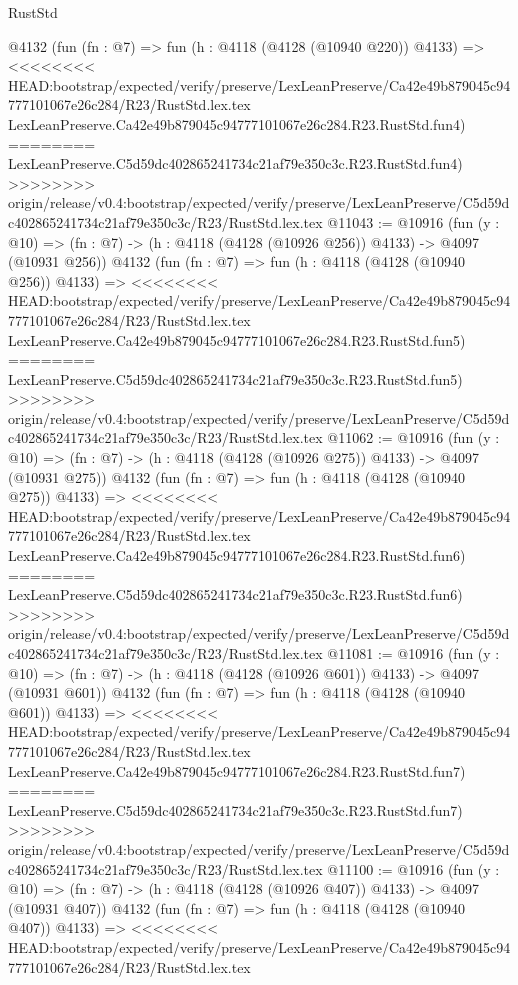 \begin{lexlean}{RustStd}
\begin{coremodule}
{\begin{coremodule}
{{{{{{{{{{{{{{    @4132
    (fun (fn : @7) =>
    fun (h : @4118 (@4128 (@10940 @220)) @4133) =>
<<<<<<<< HEAD:bootstrap/expected/verify/preserve/LexLeanPreserve/Ca42e49b879045c94777101067e26c284/R23/RustStd.lex.tex
    LexLeanPreserve.Ca42e49b879045c94777101067e26c284.R23.RustStd.fun4)
========
    LexLeanPreserve.C5d59dc402865241734c21af79e350c3c.R23.RustStd.fun4)
>>>>>>>> origin/release/v0.4:bootstrap/expected/verify/preserve/LexLeanPreserve/C5d59dc402865241734c21af79e350c3c/R23/RustStd.lex.tex
@11043 := @10916
    (fun (y : @10) => (fn : @7) -> (h : @4118 (@4128 (@10926 @256)) @4133) -> @4097 (@10931 @256))
    @4132
    (fun (fn : @7) =>
    fun (h : @4118 (@4128 (@10940 @256)) @4133) =>
<<<<<<<< HEAD:bootstrap/expected/verify/preserve/LexLeanPreserve/Ca42e49b879045c94777101067e26c284/R23/RustStd.lex.tex
    LexLeanPreserve.Ca42e49b879045c94777101067e26c284.R23.RustStd.fun5)
========
    LexLeanPreserve.C5d59dc402865241734c21af79e350c3c.R23.RustStd.fun5)
>>>>>>>> origin/release/v0.4:bootstrap/expected/verify/preserve/LexLeanPreserve/C5d59dc402865241734c21af79e350c3c/R23/RustStd.lex.tex
@11062 := @10916
    (fun (y : @10) => (fn : @7) -> (h : @4118 (@4128 (@10926 @275)) @4133) -> @4097 (@10931 @275))
    @4132
    (fun (fn : @7) =>
    fun (h : @4118 (@4128 (@10940 @275)) @4133) =>
<<<<<<<< HEAD:bootstrap/expected/verify/preserve/LexLeanPreserve/Ca42e49b879045c94777101067e26c284/R23/RustStd.lex.tex
    LexLeanPreserve.Ca42e49b879045c94777101067e26c284.R23.RustStd.fun6)
========
    LexLeanPreserve.C5d59dc402865241734c21af79e350c3c.R23.RustStd.fun6)
>>>>>>>> origin/release/v0.4:bootstrap/expected/verify/preserve/LexLeanPreserve/C5d59dc402865241734c21af79e350c3c/R23/RustStd.lex.tex
@11081 := @10916
    (fun (y : @10) => (fn : @7) -> (h : @4118 (@4128 (@10926 @601)) @4133) -> @4097 (@10931 @601))
    @4132
    (fun (fn : @7) =>
    fun (h : @4118 (@4128 (@10940 @601)) @4133) =>
<<<<<<<< HEAD:bootstrap/expected/verify/preserve/LexLeanPreserve/Ca42e49b879045c94777101067e26c284/R23/RustStd.lex.tex
    LexLeanPreserve.Ca42e49b879045c94777101067e26c284.R23.RustStd.fun7)
========
    LexLeanPreserve.C5d59dc402865241734c21af79e350c3c.R23.RustStd.fun7)
>>>>>>>> origin/release/v0.4:bootstrap/expected/verify/preserve/LexLeanPreserve/C5d59dc402865241734c21af79e350c3c/R23/RustStd.lex.tex
@11100 := @10916
    (fun (y : @10) => (fn : @7) -> (h : @4118 (@4128 (@10926 @407)) @4133) -> @4097 (@10931 @407))
    @4132
    (fun (fn : @7) =>
    fun (h : @4118 (@4128 (@10940 @407)) @4133) =>
<<<<<<<< HEAD:bootstrap/expected/verify/preserve/LexLeanPreserve/Ca42e49b879045c94777101067e26c284/R23/RustStd.lex.tex
}}}}}}}}}}}}}}
\end{coremodule}}
\end{coremodule}
\end{lexlean}
